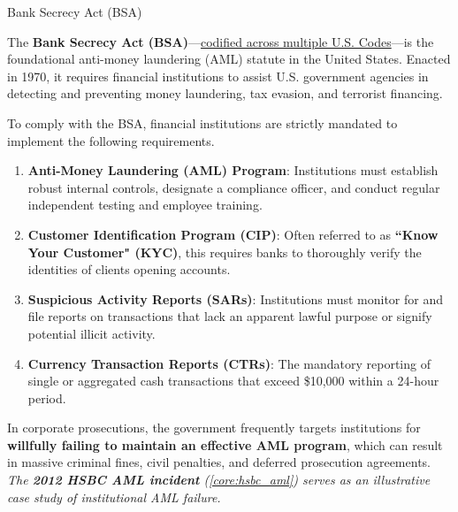 \documentclass[10pt]{article}
\begin{document}
    \begin{core}[label=core:bsa]{Bank Secrecy Act (BSA)}

      The \textbf{Bank Secrecy Act (BSA)}---\href{https://www.fincen.gov/resources/statutes-and-regulations/bank-secrecy-act}{codified across multiple U.S. Codes}---is the foundational anti-money laundering (AML) statute in the United States. Enacted in 1970, it requires financial institutions to assist U.S. government agencies in detecting and preventing money laundering, tax evasion, and terrorist financing.
      
      To comply with the BSA, financial institutions are strictly mandated to implement the following requirements.
      
      \begin{enumerate}
        \item \textbf{Anti-Money Laundering (AML) Program}: Institutions must establish robust internal controls, designate a compliance officer, and conduct regular independent testing and employee training.
        
        \item \textbf{Customer Identification Program (CIP)}: Often referred to as \textbf{``Know Your Customer" (KYC)}, this requires banks to thoroughly verify the identities of clients opening accounts.
        
        \item \textbf{Suspicious Activity Reports (SARs)}: Institutions must monitor for and file reports on transactions that lack an apparent lawful purpose or signify potential illicit activity.
        
        \item \textbf{Currency Transaction Reports (CTRs)}: The mandatory reporting of single or aggregated cash transactions that exceed \$10,000 within a 24-hour period.
      \end{enumerate}
      
      In corporate prosecutions, the government frequently targets institutions for \textbf{willfully failing to maintain an effective AML program}, which can result in massive criminal fines, civil penalties, and deferred prosecution agreements. \textit{The \textbf{2012 HSBC AML incident} (\autoref{core:hsbc_aml}) serves as an illustrative case study of institutional AML failure.}

    \end{core}
\end{document}
